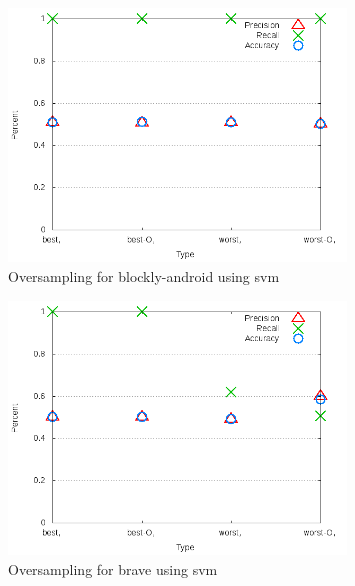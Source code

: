 \clearpage

\begin{figure}[!t]
\centering
\includegraphics[width=0.8\textwidth]{images/svm/test_4/blockly-android_sample_range.png}
\caption{Oversampling for blockly-android using \gls{svm}}
\label{fig:test_4_blockly-android_svm}
\end{figure}

\begin{figure}[!t]
\centering
\includegraphics[width=0.8\textwidth]{images/svm/test_4/brave_sample_range.png}
\caption{Oversampling for brave using \gls{svm}}
\label{fig:test_4_brave_svm}
\end{figure}

